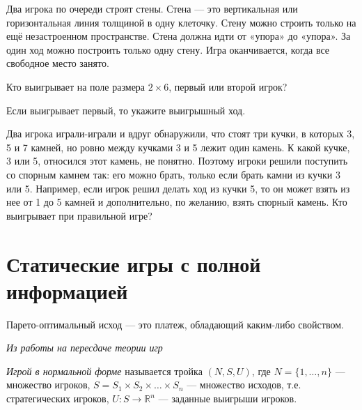 \begin{problem}

Два игрока по очереди строят стены. Стена — это вертикальная или горизонтальная линия толщиной в одну клеточку. Стену можно строить только на ещё незастроенном пространстве. Стена должна идти от «упора» до «упора». За один ход можно построить только одну стену. Игра оканчивается, когда все свободное место занято.

Кто выигрывает на поле размера $2\times 6$, первый или второй игрок?

Если выигрывает первый, то укажите выигрышный ход.



\begin{sol}

\end{sol}
\end{problem}




\begin{problem}

Два игрока играли-играли и вдруг обнаружили, что стоят три кучки, в которых 3, 5 и 7 камней, но ровно между кучками 3 и 5 лежит один камень. К какой кучке, 3 или 5, относился этот камень, не понятно. Поэтому игроки решили поступить со спорным камнем так: его можно брать, только если брать камни из кучки 3 или 5. Например, если игрок решил делать ход из кучки 5, то он может взять из нее от 1 до 5 камней и дополнительно, по желанию, взять спорный камень. Кто выигрывает при правильной игре?



\begin{sol}

\end{sol}
\end{problem}








\section{Статические игры с полной информацией} %

Парето-оптимальный исход — это платеж, обладающий каким-либо свойством.

{\it Из работы на пересдаче теории игр}

{\it Игрой в нормальной форме} называется тройка $ (N,S,U)$, где $N=\{1,\dots,n\}$ — множество игроков, $S=S_1 \times S_2 \times \ldots \times S_n$ — множество исходов, т.е. стратегических игроков, $U: S \to \mathbb{R}^n$ — заданные выигрыши игроков.

